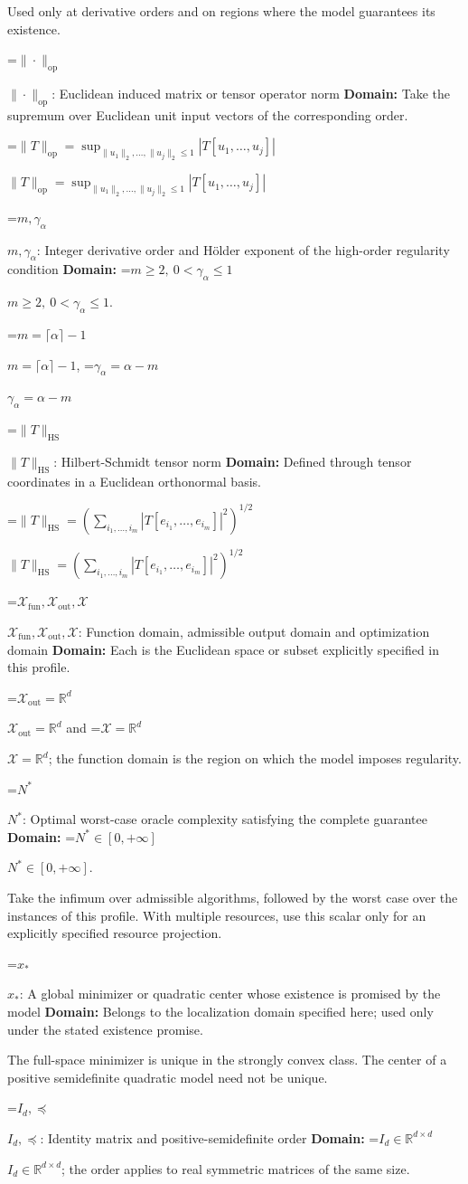 \documentclass[10pt,a4paper]{article}
\newcommand{\AtlasMath}[1]{\par\begingroup\centering\setbox0=\hbox{$\displaystyle #1$}\ifdim\wd0>1.4\linewidth\typeout{ATLAS WIDE FORMULA: \the\wd0}\fi\ifdim\wd0>\linewidth\resizebox{\linewidth}{!}{\box0}\else\box0\fi\par\endgroup}
\newcommand{\AtlasInlineMath}[1]{\begingroup\setbox0=\hbox{$#1$}\ifdim\wd0>.4\linewidth\endgroup\AtlasMath{#1}\else\endgroup$#1$\fi}
\begin{document}
Used only at derivative orders and on regions where the model guarantees its existence.

\AtlasInlineMath{\|\cdot\|_{\mathrm{op}}}: Euclidean induced matrix or tensor operator norm \textbf{Domain:} Take the supremum over Euclidean unit input vectors of the corresponding order.

\AtlasInlineMath{\|T\|_{\mathrm{op}}=\sup_{\|u_1\|_2,\ldots,\|u_j\|_2\le1}|T[u_1,\ldots,u_j]|}

\AtlasInlineMath{m,\gamma_\alpha}: Integer derivative order and Hölder exponent of the high-order regularity condition \textbf{Domain:} \AtlasInlineMath{m\ge2,\ 0<\gamma_\alpha\le1}.

\AtlasInlineMath{m=\lceil\alpha\rceil-1}, \AtlasInlineMath{\gamma_\alpha=\alpha-m}

\AtlasInlineMath{\|T\|_{\mathrm{HS}}}: Hilbert-Schmidt tensor norm \textbf{Domain:} Defined through tensor coordinates in a Euclidean orthonormal basis.

\AtlasInlineMath{\|T\|_{\mathrm{HS}}=(\sum_{i_1,\ldots,i_m}|T[e_{i_1},\ldots,e_{i_m}]|^2)^{1/2}}

\AtlasInlineMath{\mathcal{X}_{\mathrm{fun}},\mathcal{X}_{\mathrm{out}},\mathcal{X}}: Function domain, admissible output domain and optimization domain \textbf{Domain:} Each is the Euclidean space or subset explicitly specified in this profile.

\AtlasInlineMath{\mathcal{X}_{\mathrm{out}}=\mathbb{R}^d} and \AtlasInlineMath{\mathcal{X}=\mathbb{R}^d}; the function domain is the region on which the model imposes regularity.

\AtlasInlineMath{N^*}: Optimal worst-case oracle complexity satisfying the complete guarantee \textbf{Domain:} \AtlasInlineMath{N^*\in[0,+\infty]}.

Take the infimum over admissible algorithms, followed by the worst case over the instances of this profile. With multiple resources, use this scalar only for an explicitly specified resource projection.

\AtlasInlineMath{x_*}: A global minimizer or quadratic center whose existence is promised by the model \textbf{Domain:} Belongs to the localization domain specified here; used only under the stated existence promise.

The full-space minimizer is unique in the strongly convex class. The center of a positive semidefinite quadratic model need not be unique.

\AtlasInlineMath{I_d,\preceq}: Identity matrix and positive-semidefinite order \textbf{Domain:} \AtlasInlineMath{I_d\in\mathbb{R}^{d\times d}}; the order applies to real symmetric matrices of the same size.
\end{document}
